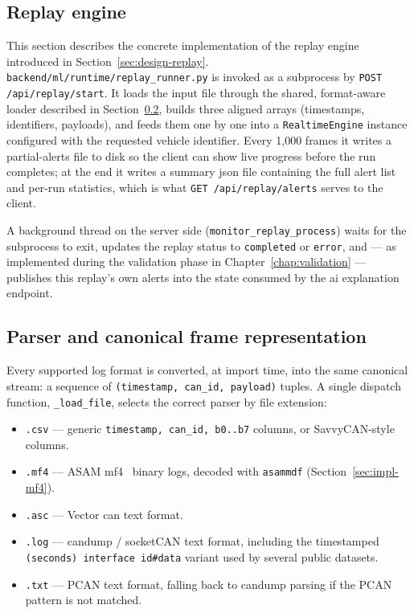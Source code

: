 \subsection{Replay engine}
\label{sec:impl-replay}

This section describes the concrete implementation of the replay engine introduced in Section~\ref{sec:design-replay}. \texttt{backend/ml/runtime/replay\_runner.py} is invoked as a subprocess by \texttt{POST /api/replay/start}. It loads the input file through the shared, format-aware loader described in Section~\ref{sec:impl-parser}, builds three aligned arrays (timestamps, identifiers, payloads), and feeds them one by one into a \texttt{RealtimeEngine} instance configured with the requested vehicle identifier. Every 1{,}000 frames it writes a partial-alerts file to disk so the client can show live progress before the run completes; at the end it writes a summary \gls{json} file containing the full alert list and per-run statistics, which is what \texttt{GET /api/replay/alerts} serves to the client.

A background thread on the server side (\texttt{monitor\_replay\_process}) waits for the subprocess to exit, updates the replay status to \texttt{completed} or \texttt{error}, and — as implemented during the validation phase in Chapter~\ref{chap:validation} — publishes this replay's own alerts into the state consumed by the \gls{ai} explanation endpoint.

\subsection{Parser and canonical frame representation}
\label{sec:impl-parser}

Every supported log format is converted, at import time, into the same canonical stream: a sequence of \texttt{(timestamp, can\_id, payload)} tuples. A single dispatch function, \texttt{\_load\_file}, selects the correct parser by file extension:

\begin{itemize}
    \item \texttt{.csv} — generic \texttt{timestamp, can\_id, b0..b7} columns, or SavvyCAN-style columns.
    \item \texttt{.mf4} — ASAM \gls{mf4}~\cite{asam_mdf} binary logs, decoded with \texttt{asammdf} (Section~\ref{sec:impl-mf4}).
    \item \texttt{.asc} — Vector \gls{can} text format.
    \item \texttt{.log} — candump / socketCAN text format, including the timestamped \texttt{(seconds) interface id\#data} variant used by several public datasets.
    \item \texttt{.txt} — PCAN text format, falling back to candump parsing if the PCAN pattern is not matched.
\end{itemize}

